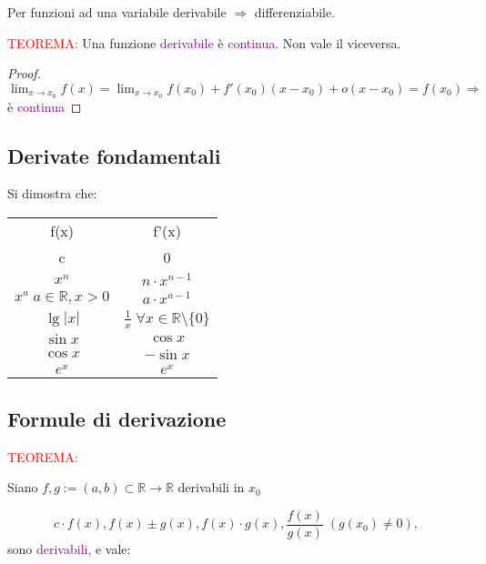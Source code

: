 \documentclass{article}
\begin{document}
Per funzioni ad una variabile derivabile $\Rightarrow $ differenziabile. 

\begin{tcolorbox}[colback= red!15!yellow!5!white, colframe=red]
  \textcolor{red}{TEOREMA: }
  Una funzione \textcolor{purple}{derivabile} è \textcolor{purple}{continua}. Non vale il viceversa. 
\end{tcolorbox}

\begin{proof}

$\lim_{x \to x_0} f(x) = \lim_{x \to x_0} f(x_0) + f'(x_0)(x - x_0) + o(x - x_0) = f(x_0) \Rightarrow $ è \textcolor{purple}{continua}
    
\end{proof}

\subsection{Derivate fondamentali}
Si dimostra che: 

\begin{table}[h]
    \centering
    \begin{tabular}{|c|c|}
         f(x)& f'(x) \\
         c& 0\\
         $x^n$ & $n\cdot x^{n-1}$\\
         $x^a \; a \in \mathbb{R}, x >0 $&  $ a\cdot x^{a-1}$\\
         $\lg|x|$ &  $\frac{1}{x} \; \forall x \in \mathbb{R}\setminus \{0\}$\\
          $\sin x$ & $\cos x$\\
         $ \cos x $& $-\sin x$ \\
         $e^x$& $e^x$ \\
    \end{tabular}
\end{table}

\subsection{Formule di derivazione}

\begin{tcolorbox}[colback= red!15!yellow!5!white, colframe=red]
  \textcolor{red}{TEOREMA: }
 
Siano $f,g := (a,b) \subset \mathbb{R} \to \mathbb{R}$ derivabili in $x_0$

\[c\cdot f(x), f(x)\pm g(x), f(x)\cdot g(x), \frac{f(x)}{g(x)} \; (g(x_0)\neq 0), \]
sono \textcolor{purple}{derivabili}, e vale: 
\end{tcolorbox}
\end{document}
